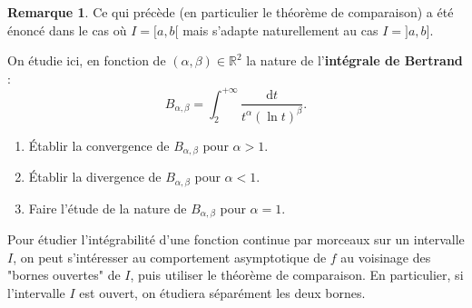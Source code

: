 \documentclass[french]{article}
\newcommand{\R}{\mathbb{R}}
\renewcommand{\d}{\text{d}}
\theoremstyle{plain}
\theoremstyle{definition}
\newtheorem*{rmq}{Remarque}
\theoremstyle{remark}
\begin{document}
\begin{rmq}
	Ce qui précède (en particulier le théorème de comparaison) a été énoncé dans le cas où $I=[a,b[$ mais s'adapte naturellement au cas $I=]a,b]$.
\end{rmq}

\begin{exo}
	On étudie ici, en fonction de $(\alpha,\beta)\in\R^2$ la nature de l'\textbf{intégrale de Bertrand} : $$B_{\alpha,\beta}=\int_{2}^{+\infty}\frac{\d t}{t^\alpha(\ln t)^\beta}.$$
	\begin{enumerate}
		\item Établir la convergence de $B_{\alpha,\beta}$ pour $\alpha>1$.
		\item Établir la divergence de $B_{\alpha,\beta}$ pour $\alpha<1$.
		\item Faire l'étude de la nature de $B_{\alpha,\beta}$ pour $\alpha=1$.
	\end{enumerate}
\end{exo}

\begin{met}
	Pour étudier l'intégrabilité d'une fonction continue par morceaux sur un intervalle $I$, on peut s'intéresser au comportement asymptotique de $f$ au voisinage des "bornes ouvertes" de $I$, puis utiliser le théorème de comparaison. En particulier, si l'intervalle $I$ est ouvert, on étudiera séparément les deux bornes.
\end{met}
\end{document}
